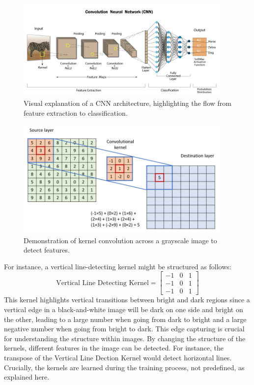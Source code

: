 \begin{figure}
    \centering
    \includegraphics[width=400px]{Figures/MLintro/cnn.png}
    \caption{Visual explanation of a CNN architecture, highlighting the flow from feature extraction to classification.}
    \label{fig: cnn}
\end{figure}
\begin{figure}
    \centering
    \includegraphics[width=400px]{Figures/MLintro/kernelConv.png}
    \caption{Demonstration of kernel convolution across a grayscale image to detect features.}
    \label{fig: kernelconv}
\end{figure}

For instance, a vertical line-detecting kernel might be structured as follows: 
\[
\text{Vertical Line Detecting Kernel} = 
\begin{bmatrix}
-1 & 0 & 1 \\
-1 & 0 & 1 \\
-1 & 0 & 1
\end{bmatrix}
\]
This kernel highlights vertical transitions between bright and dark regions since a vertical edge in a black-and-white image will be dark on one side and bright on the other, leading to a large number when going from dark to bright and a large negative number when going from bright to dark. This edge capturing is crucial for understanding the structure within images. By changing the structure of the kernels, different features in the image can be detected. For instance, the transpose of the Vertical Line Dection Kernel would detect horizontal lines. Crucially, the kernels are learned during the training process, not predefined, as explained here.

